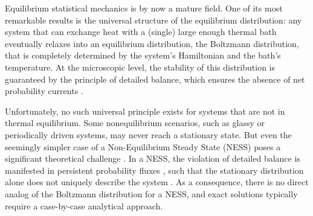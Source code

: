 Equilibrium statistical mechanics is by now a mature field. One of its most remarkable results is the universal structure of the equilibrium distribution: any system that can exchange heat with a (single) large enough thermal bath eventually relaxes into an equilibrium distribution, the Boltzmann distribution, that is completely determined by the system's Hamiltonian and the bath's temperature. At the microscopic level, the stability of this distribution is guaranteed by the principle of detailed balance, which ensures the absence of net probability currents \cite{seifert2012stochastic}.

Unfortunately, no such universal principle exists for systems that are not in thermal equilibrium. Some nonequilibrium scenarios, such as glassy or periodically driven systems, may never reach a stationary state. But even the seemingly simpler case of a Non-Equilibrium Steady State (NESS) poses a significant theoretical challenge \cite{sasa2006steady}. In a NESS, the violation of detailed balance is manifested in persistent probability fluxes \cite{seifert2012stochastic, sasa2006steady, zia2007probability}, such that the stationary distribution alone does not uniquely describe the system \cite{zia2007probability}. As a consequence, there is no direct analog of the Boltzmann distribution for a NESS, and exact solutions typically require a case-by-case analytical approach.

